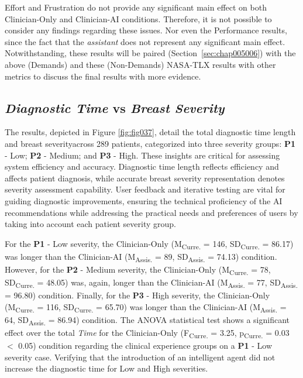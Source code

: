 Effort and Frustration do not provide any significant main effect on both Clinician-Only and Clinician-AI conditions.
Therefore, it is not possible to consider any findings regarding these issues.
Nor even the Performance results, since the fact that the {\it assistant} does not represent any significant main effect.
Notwithstanding, these results will be paired (Section~\ref{sec:chap005006}) with the above (Demands) and these (Non-Demands) \ac{NASA-TLX} results with other metrics to discuss the final results with more evidence.

\subsection{{\it Diagnostic Time} vs {\it Breast Severity}}
\label{sec:app003004005}

The results, depicted in Figure \ref{fig:fig037}, detail the total diagnostic time length and breast severity\footnotemark[23] across 289 patients, categorized into three severity groups:
{\bf P1} - Low;
{\bf P2} - Medium; and
{\bf P3} - High.
These insights are critical for assessing system efficiency and accuracy.
Diagnostic time length reflects efficiency and affects patient diagnosis, while accurate breast severity representation denotes severity assessment capability.
User feedback and iterative testing are vital for guiding diagnostic improvements, ensuring the technical proficiency of the \ac{AI} recommendations while addressing the practical needs and preferences of users by taking into account each patient severity group.


For the {\bf P1} - Low severity, the Clinician-Only (M\textsubscript{Curre.} = 146, SD\textsubscript{Curre.} = 86.17) was longer than the Clinician-AI (M\textsubscript{Assis.} = 89, SD\textsubscript{Assis.} = 74.13) condition.
However, for the {\bf P2} - Medium severity, the Clinician-Only (M\textsubscript{Curre.} = 78, SD\textsubscript{Curre.} = 48.05) was, again, longer than the Clinician-AI (M\textsubscript{Assis.} = 77, SD\textsubscript{Assis.} = 96.80) condition.
Finally, for the {\bf P3} - High severity, the Clinician-Only (M\textsubscript{Curre.} = 116, SD\textsubscript{Curre.} = 65.70) was longer than the Clinician-AI (M\textsubscript{Assis.} = 64, SD\textsubscript{Assis.} = 86.94) condition.
The \ac{ANOVA} statistical test shows a significant effect over the total {\it Time} for the Clinician-Only (F\textsubscript{Curre.} = 3.25, p\textsubscript{Curre.} = 0.03 $<$ 0.05) condition regarding the clinical experience groups on a {\bf P1} - Low severity case.
Verifying that the introduction of an intelligent agent did not increase the diagnostic time for Low and High severities.

